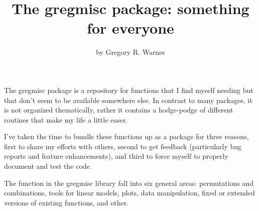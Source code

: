 \documentclass{report}
\begin{document}
\author{by Gregory R. Warnes}
\title{The gregmisc package: something for everyone}
\subtitle{}

\maketitle

The gregmisc package is a repository for functions that I find myself
needing but that don't seem to be available somewhere else.  In
contrast to many packages, it is not organized thematically, rather
it contains a hodge-podge of different routines that make my life a
little easer.

I've taken the time to bundle these functions up as a package for
three reasons, first to share my efforts with others, second to get
feedback (particularly bug reports and feature enhancements), and
third to force myself to properly document and test the code.

The function in the gregmisc library fall into six general areas:
permutations and combinations, tools for linear models, plots, data
manipulation, fixed or extended versions of existing functions, and other.
\end{document}
